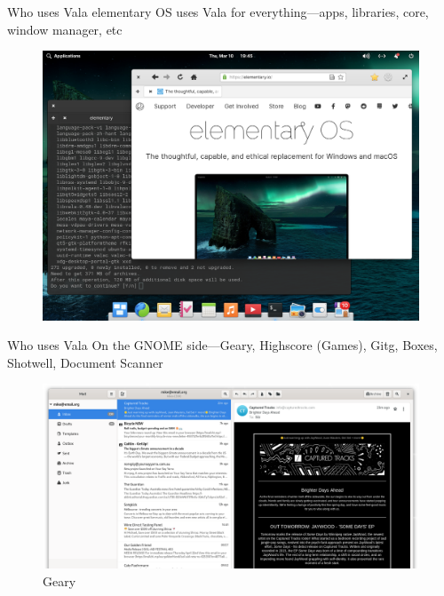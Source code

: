 \documentclass[t]{beamer}
\begin{document}
\begin{frame}[c]{Who uses Vala}
elementary OS uses Vala for everything---apps, libraries, core, window manager, etc

\begin{figure}
    \begin{center}
        \includegraphics[scale=.125]{res/elementaryos-gala.png}
    \end{center}
\end{figure}
\end{frame}

\begin{frame}[c]{Who uses Vala}
On the GNOME side---Geary, Highscore (Games), Gitg, Boxes, Shotwell, Document Scanner

\begin{figure}
    \begin{center}
        \includegraphics[scale=.18]{res/geary.png}
        \caption{Geary}
    \end{center}
\end{figure}
\end{frame}
\end{document}
